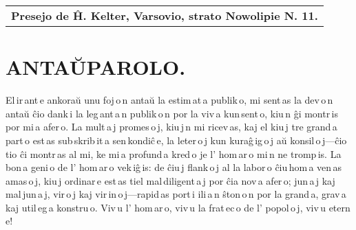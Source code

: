 \documentclass[ngerman,12pt,twoside]{book}
\begin{document}
\setlength{\parskip}{0pt}

\vspace*{\fill}

\begin{flushright}
\begin{tabular}{r}
\hline
\bf\footnotesize Presejo de Ĥ. Kelter, Varsovio, strato Nowolipie N. 11.
\end{tabular}
\end{flushright}

\vspace*{\fill}

%
%
\titleformat{\chapter}[display]{\centering}{}{0pt}{\cowboyfont\LARGE}
\renewcommand{\footrulewidth}{0pt}
\chapter*{ANTAŬPAROLO.}
\fancyhead[C]{--- \thepage{} ---}

\begin{center}
\end{center}

El\,ir\,ant\,e ankoraŭ unu foj\,o\,n antaŭ la estim\,at\,a publik\,o, mi sent\,as la dev\,o\,n antaŭ ĉio dank\,i la leg\,ant\,a\,n publik\,o\,n por la viv\,a kun\,sent\,o, kiu\,n ĝi montr\,is por mi\,a afer\,o. La mult\,a\,j promes\,o\,j, kiu\,j\,n mi ricev\,as, kaj el kiu\,j tre grand\,a part\,o est\,as sub\,skrib\,it\,a \glqq{}sen\,kondiĉ\,e\grqq{}, la leter\,o\,j kun kuraĝ\,ig\,o\,j aŭ konsil\,o\,j---ĉio tio ĉi montr\,as al mi, ke mi\,a profund\,a kred\,o je l' hom\,ar\,o mi\,n ne tromp\,is. La bon\,a geni\,o de l' hom\,ar\,o vek\,iĝ\,is: de ĉiu\,j flank\,o\,j al la labor\,o ĉiu\,hom\,a ven\,as amas\,o\,j, kiu\,j ordinar\,e est\,as tiel mal\,diligent\,a\,j por ĉia nov\,a afer\,o; jun\,a\,j kaj mal\,jun\,a\,j, vir\,o\,j kaj vir\,in\,o\,j---rapid\,as port\,i ili\,a\,n ŝton\,o\,n por la grand\,a, grav\,a kaj util\,eg\,a konstru\,o. Viv\,u l' hom\,ar\,o, viv\,u la frat\,ec\,o de l' popol\,o\,j, viv\,u etern\,e!
\end{document}
